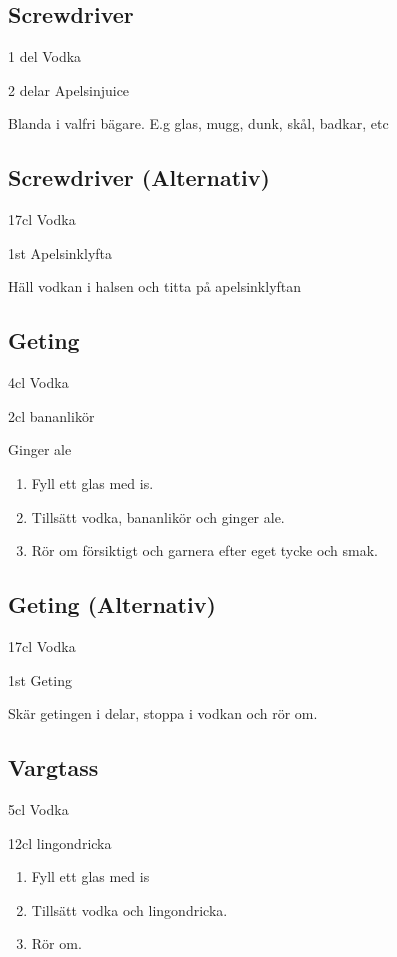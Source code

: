 \subsection{\textbf{Screwdriver}}

1 del Vodka

2 delar Apelsinjuice

Blanda i valfri bägare. E.g glas, mugg, dunk, skål, badkar, etc
\filbreak
\subsection{\textbf{Screwdriver (Alternativ)}}

17cl Vodka

1st Apelsinklyfta

Häll vodkan i halsen och titta på apelsinklyftan
\filbreak
\subsection{\textbf{Geting}}

4cl Vodka

2cl bananlikör

Ginger ale

\begin{enumerate}
    \item Fyll ett glas med is.
    \item Tillsätt vodka, bananlikör och ginger ale.
    \item Rör om försiktigt och garnera efter eget tycke och smak.
\end{enumerate}
\filbreak
\subsection{\textbf{Geting (Alternativ)}}

17cl Vodka

1st Geting

Skär getingen i delar, stoppa i vodkan och rör om.
\filbreak
\subsection{\textbf{Vargtass}}

5cl Vodka

12cl lingondricka

\begin{enumerate}
    \item Fyll ett glas med is
    \item Tillsätt vodka och lingondricka.
    \item Rör om.
\end{enumerate}
\filbreak
